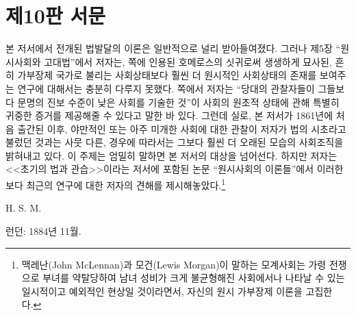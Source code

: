 \chapter*{제10판 서문}

본 저서에서 전개된 법발달의 이론은 일반적으로 널리 받아들여졌다.
그러나
제5장 ``원시사회와 고대법''에서
저자는,
\pageref{cyclops}쪽에 인용된
호메로스의 싯귀로써 생생하게 묘사된,
흔히 가부장제 국가로 불리는
사회상태보다
훨씬 더 원시적인 사회상태의 존재를 보여주는 연구에 대해서는
충분히 다루지 못했다.
\pageref{contemporary}쪽에서 저자는
``당대의 관찰자들이 그들보다 문명의 진보 수준이 낮은 사회를 기술한 것''이
사회의 원초적 상태에 관해 특별히 귀중한 증거를 제공해줄 수 있다고
말한 바 있다.
그런데 실로,
본 저서가 1861년에 처음 출간된 이후,
야만적인 또는 아주 미개한 사회에 대한 관찰이
저자가 법의 시초라고 불렀던 것과는 사뭇 다른,
경우에 따라서는 그보다 훨씬 더 오래된
모습의 사회조직을 밝혀내고 있다.
이 주제는 엄밀히 말하면 본 저서의 대상을 넘어선다.
하지만
저자는
<<초기의 법과 관습>>이라는
저서에 포함된 논문
``원시사회의 이론들''에서
이러한 보다 최근의 연구에 대한 저자의 견해를 제시해놓았다.\footnote{%
  맥레난(John McLennan)과 모건(Lewis Morgan)이 말하는 모계사회는
  가령 전쟁으로 부녀를 약탈당하여 남녀 성비가 크게 불균형해진 사회에서나
  나타날 수 있는 일시적이고 예외적인 현상일 것이라면서,
  자신의 원시 가부장제 이론을 고집한다.
}

\begin{flushright}
H. S. M.
\end{flushright}

\begin{footnotesize}
런던: 1884년 11월.
\end{footnotesize}

